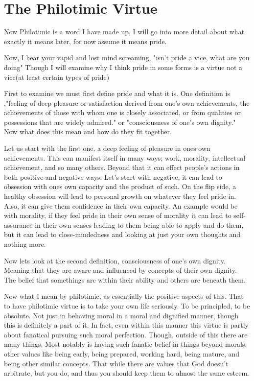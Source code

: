 \section{The Philotimic Virtue}
\par Now Philotimic is a word I have made up, I will go into more detail about what exactly it means later, for now assume it means pride.
\par Now, I hear your vapid and lost mind screaming, "isn't pride a vice, what are you doing" Though I will examine why I think pride in some forms is a virtue not a vice(at least certain types of pride)
\par First to examine we must first define pride and what it is. One definition is ,"feeling of deep pleasure or satisfaction derived from one's own achievements, the achievements of those with whom one is closely associated, or from qualities or possessions that are widely admired." or "consciousness of one's own dignity." Now what does this mean and how do they fit together.
\par Let us start with the first one, a deep feeling of pleasure in ones own achievements. This can manifest itself in many ways; work, morality, intellectual achievement, and so many others. Beyond that it can effect people's actions in both positive and negative ways. Let's start with negative, it can lead to obsession with ones own capacity and the product of such. On the flip side, a healthy obsession will lead to personal growth on whatever they feel pride in. Also, it can give them confidence in their own capacity. An example would be with morality, if they feel pride in their own sense of morality it can lead to self-assurance in their own senses leading to them being able to apply and do them, but it can lead to close-mindedness and looking at just your own thoughts and nothing more.
\par Now lets look at the second definition, consciousness of one's own dignity. Meaning that they are aware and influenced by concepts of their own dignity. The belief that somethings are within their ability and others are beneath them.
\par Now what I mean by philotimic, as essentially the positive aspects of this. That to have philotimic virtue is to take your own life seriously. To be principled, to be absolute. Not just in behaving moral in a moral and dignified manner, though this is definitely a part of it. In fact, even within this manner this virtue is partly about fanatical pursuing such moral perfection. Though, outside of this there are many things. Most notably is having such fanatic belief in things beyond morals, other values like being early, being prepared, working hard, being mature, and being other similar concepts. That while there are values that God doesn't arbitrate, but you do, and thus you should keep them to almost the same esteem.
